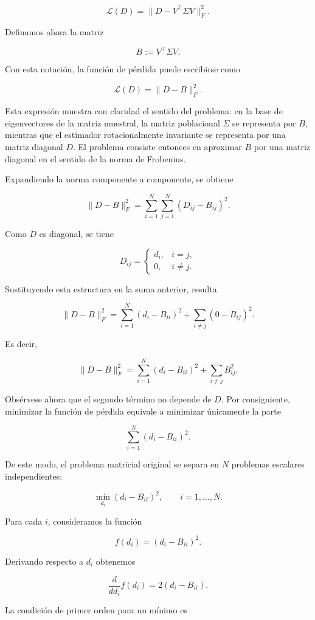 \documentclass[letterpaper,12pt,oneside]{book}
\begin{document}
\[
\mathcal{L}(D)
=
\|D - V^\top \Sigma V\|_F^2.
\]

Definamos ahora la matriz

\[
B := V^\top \Sigma V.
\]

Con esta notación, la función de pérdida puede escribirse como

\[
\mathcal{L}(D)=\|D-B\|_F^2.
\]

Esta expresión muestra con claridad el sentido del problema: en la base de eigenvectores de la matriz muestral, la matriz poblacional $\Sigma$ se representa por $B$, mientras que el estimador rotacionalmente invariante se representa por una matriz diagonal $D$. El problema consiste entonces en aproximar $B$ por una matriz diagonal en el sentido de la norma de Frobenius.

Expandiendo la norma componente a componente, se obtiene

\[
\|D-B\|_F^2
=
\sum_{i=1}^{N}\sum_{j=1}^{N}(D_{ij}-B_{ij})^2.
\]

Como $D$ es diagonal, se tiene

\[
D_{ij}=
\begin{cases}
d_i, & i=j,\\
0, & i\neq j.
\end{cases}
\]

Sustituyendo esta estructura en la suma anterior, resulta

\[
\|D-B\|_F^2
=
\sum_{i=1}^{N}(d_i-B_{ii})^2
+
\sum_{i\neq j}(0-B_{ij})^2.
\]

Es decir,

\[
\|D-B\|_F^2
=
\sum_{i=1}^{N}(d_i-B_{ii})^2
+
\sum_{i\neq j}B_{ij}^2.
\]

Obsérvese ahora que el segundo término no depende de $D$. Por consiguiente, minimizar la función de pérdida equivale a minimizar únicamente la parte

\[
\sum_{i=1}^{N}(d_i-B_{ii})^2.
\]

De este modo, el problema matricial original se separa en $N$ problemas escalares independientes:

\[
\min_{d_i}(d_i-B_{ii})^2,
\qquad i=1,\dots,N.
\]

Para cada $i$, consideramos la función

\[
f(d_i) = (d_i - B_{ii})^2.
\]

Derivando respecto a $d_i$ obtenemos

\[
\frac{d}{d d_i} f(d_i) = 2(d_i - B_{ii}).
\]

La condición de primer orden para un mínimo es
\end{document}
